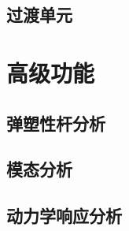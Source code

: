 \documentclass[UTF8]{ctexbook}
\begin{document}
\subsection{过渡单元}

\section{高级功能}
\subsection{弹塑性杆分析}

\subsection{模态分析}

\subsection{动力学响应分析}
\end{document}
